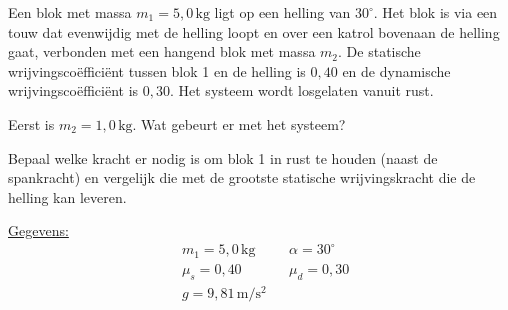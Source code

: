 \documentclass{ximera}
\begin{document}
\begin{exercise}
    Een blok met massa $m_{1}= 5{,}0 \, \mathrm{kg}$ ligt op een helling van $30^\circ$. Het blok is via een touw dat evenwijdig met de helling loopt en over een katrol bovenaan de helling gaat, verbonden met een hangend blok met massa $m_{2}$. De statische wrijvingscoëfficiënt tussen blok 1 en de helling is $0{,}40$ en de dynamische wrijvingscoëfficiënt is $0{,}30$. Het systeem wordt losgelaten vanuit rust.

    \begin{center}
    \end{center}

    \begin{question}
        Eerst is $m_{2} = 1{,}0 \, \mathrm{kg}$. Wat gebeurt er met het systeem?


        \begin{hint}
            Bepaal welke kracht er nodig is om blok 1 in rust te houden (naast de spankracht) en vergelijk die met de grootste statische wrijvingskracht die de helling kan leveren.
        \end{hint}

        \begin{solution}\nl
            \underline{Gegevens:}
            \begin{align*}
                & m_{1} = 5{,}0 \, \mathrm{kg} & & \alpha = 30^\circ \\
                & \mu_{s} = 0{,}40 & & \mu_{d} = 0{,}30 \\
                & g = 9{,}81 \, \mathrm{m/s^2} & &
            \end{align*}


\end{solution}
\end{question}
\end{exercise}
\end{document}
